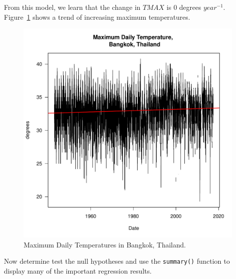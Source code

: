 \documentclass{article}\usepackage[]{graphicx}\usepackage[]{color}
\makeatletter
\def\maxwidth{ %
  \ifdim\Gin@nat@width>\linewidth
    \linewidth
  \else
    \Gin@nat@width
  \fi
}
\newenvironment{knitrout}{}{} %
\makeatother
\begin{document}
From this model, we learn that the change in $TMAX$ is 
0 degrees $year^{-1}$. Figure~\ref{fig:TMAX_trend} shows a trend of increasing maximum temperatures.

\begin{figure}
\label{fig:TMAX_trend}
\caption{Maximum Daily Temperatures in Bangkok, Thailand.}
\begin{knitrout}
\color{fgcolor}
\includegraphics[width=\maxwidth]{figure/unnamed-chunk-12-1} 

\end{knitrout}
\end{figure}

Now determine test the null hypotheses and use the \texttt{summary()} function to display many of the important regression results.
\end{document}
